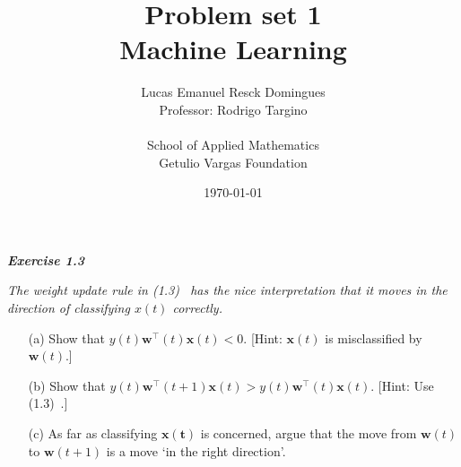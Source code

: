 \documentclass{article}
\title{Problem set 1\\
    \large{Machine Learning}}
\author{Lucas Emanuel Resck Domingues\\    
    Professor: Rodrigo Targino\\\\
    {School of Applied Mathematics}\\
    {Getulio Vargas Foundation}}
\date{\today}
\begin{document}
    \maketitle

    \noindent \textbf{\textit{Exercise 1.3}}

    \noindent \textit{The weight update rule in (1.3)~\cite{yaser2012learning} has the nice interpretation that it moves in the direction of classifying $x(t)$ correctly.}
    
    \begin{itemize}[before=\itshape]
        \item[(a)] Show that $y(t) \mathbf{w}^\intercal(t) \mathbf{x}(t) < 0$. [Hint: $\mathbf{x}(t)$ is misclassified by $\mathbf{w}(t)$.]
        \item[(b)] Show that $y(t) \mathbf{w}^\intercal(t + 1) \mathbf{x}(t) > y(t) \mathbf{w}^\intercal(t) \mathbf{x}(t)$. [Hint: Use (1.3)~\cite{yaser2012learning}.]
        \item[(c)] As far as classifying $\mathbf{x(t)}$ is concerned, argue that the move from $\mathbf{w}(t)$ to $\mathbf{w}(t + 1)$ is a move `in the right direction'.
    \end{itemize}
        

    \nocite{yaser2012learning}
    
    
\end{document}
